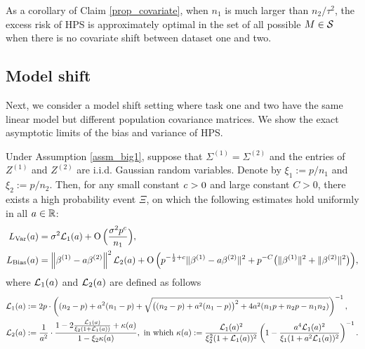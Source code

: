 As a corollary of Claim \ref{prop_covariate}, when $n_1$ is much larger than $n_2 / \tau^2$, the excess risk of HPS is approximately optimal in the set of all possible $M\in\mathcal{S}$ when there is no covariate shift between dataset one and two.





\subsection{Model shift}\label{sec_sizeratio}

Next, we consider a model shift setting where task one and two have the same linear model but different population covariance matrices.
We show the exact asymptotic limits of the bias and variance of HPS.

\begin{theorem}\label{cor_MTL_loss}
Under Assumption \ref{assm_big1}, suppose that $\Sigma^{(1)}=\Sigma^{(2)}$ and the entries of $Z^{(1)}$ and $Z^{(2)}$ are i.i.d. Gaussian random variables.
Denote by $\xi_1:=p/n_1$ and $\xi_2:=p/n_2$.
Then, for any small constant ${\mathit{c}}>0$ and large constant $C>0$, there exists a high probability event $\Xi$, on which the following estimates hold uniformly in all $a\in \mathbb{R}$:
\begin{align}
L_{\var}(a) &= \sigma^2  \cal L_1(a)+ \OO\Big(\frac {\sigma^2 p^{c}} {n_1}\Big), \label{Lvar_samplesize} \\
L_{\bias}(a)&= \bignorm{\beta^{(1)}-a\beta^{(2)}}^2 \cal L_2(a) +  \OO\Big(p^{-\frac 1 2 + c}  \norm{\beta^{(1)}-a\beta^{(2)}}^2
+ p^{-C}\big( \|\beta^{(1)} \|^2  +  \|\beta^{(2)} \|^2\big)   \Big),\label{Lbias_samplesize}
\end{align}
where $\mathcal{L}_1(a)$ and $\mathcal{L}_2(a)$ are defined as follows
\begin{align*}
\cal L_1(a) &:= {2p}\cdot\left((n_2 - p) + a^2 (n_1 - p) + \sqrt{\big( (n_2 - p) + a^2 (n_1 - p)\big)^2 + 4a^2(n_1 p + n_2 p - n_1 n_2)}\right)^{-1}, \\
\cal L_2(a) &:= \frac1{a^2}\cdot \frac{1- 2\frac{\cal L_1(a)}{\xi_2(1 + \cal L_1(a))} + \kappa(a)}{1- \xi_2 \kappa(a)}, \text{ in which }
\kappa(a) := \frac{\cal L_1(a)^2}{\xi_2^2(1+\cal L_1(a))^2}  \left(1 - \frac{a^4 \cal L_1(a)^2 }{\xi_1(1+a^2\cal L_1(a) )^2}\right)^{-1}.

\end{align*}
\end{theorem}
